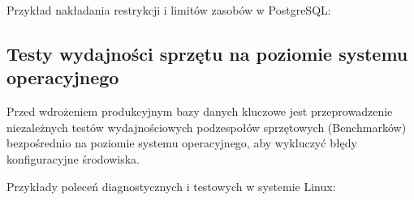 \documentclass[letterpaper,10pt,polish]{sphinxmanual}
\begin{document}
\sphinxAtStartPar
Przykład nakładania restrykcji i limitów zasobów w PostgreSQL:

\begin{sphinxVerbatim}[commandchars=\\\{\}]


\end{sphinxVerbatim}


\subsection{Testy wydajności sprzętu na poziomie systemu operacyjnego}
\label{\detokenize{rozdzia_u0142_2/rozdzia_u0142_25/index:testy-wydajnosci-sprzetu-na-poziomie-systemu-operacyjnego}}
\sphinxAtStartPar
Przed wdrożeniem produkcyjnym bazy danych kluczowe jest przeprowadzenie niezależnych testów wydajnościowych podzespołów sprzętowych (Benchmarków) bezpośrednio na poziomie systemu operacyjnego, aby wykluczyć błędy konfiguracyjne środowiska.

\sphinxAtStartPar
Przykłady poleceń diagnostycznych i testowych w systemie Linux:
\end{document}
